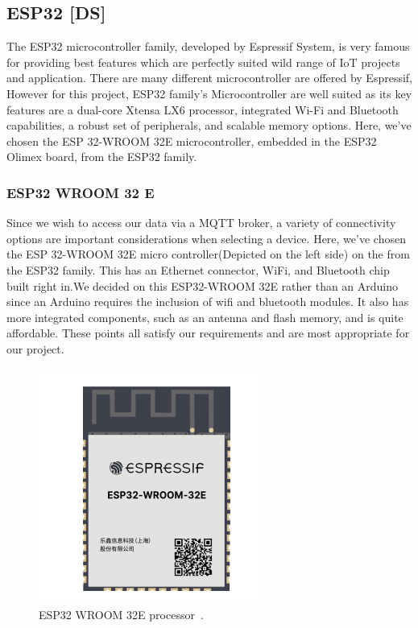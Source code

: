 	\subsection{ESP32 [DS]}
		\label{sec:esp32}
		
		The ESP32 microcontroller family, developed by Espressif System, is very famous for providing best features which are perfectly suited wild range of IoT projects and application. There are many different microcontroller are offered by Espressif, However for this project, ESP32 family’s Microcontroller are well suited as its key features are a dual-core Xtensa LX6 processor, integrated Wi-Fi and Bluetooth capabilities, a robust set of peripherals, and scalable memory options. Here, we've chosen the ESP 32-WROOM 32E microcontroller, embedded in the ESP32 Olimex board,  from the ESP32 family.
		
		\subsubsection{ESP32 WROOM 32 E}
			Since we wish to access our data via a MQTT broker, a variety of connectivity options are important considerations when selecting a device. Here, we've chosen the ESP 32-WROOM 32E micro controller(Depicted on the left side) on the  from the ESP32 family. This has an Ethernet connector, WiFi, and Bluetooth chip built right in.We decided on this ESP32-WROOM 32E rather than an Arduino since an Arduino requires the inclusion of wifi and bluetooth modules. It also has more integrated components, such as an antenna and flash memory, and is quite affordable. These points all satisfy our requirements and are most appropriate for our project.
		
			\begin{figure}[H]
				\centering
				\includegraphics[width=0.4\linewidth]{assets/DS-esp32.png} 
				\caption{ESP32 WROOM 32E processor~\cite{esp-32-package}.}
			\end{figure}
		
